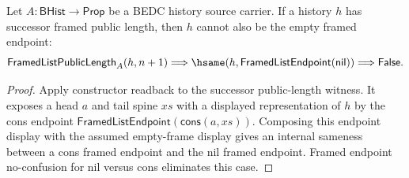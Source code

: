 
\begin{theorem}
\label{thm:framed-list-public-length-successor-empty-absurd}
Let $A:\mathsf{BHist}\to\mathsf{Prop}$ be a BEDC history source carrier. If a
history $h$ has successor framed public length, then $h$ cannot also be the
empty framed endpoint:
$$
\mathsf{FramedListPublicLength}_A(h,n+1)
\Longrightarrow
\hsame(h,\mathsf{FramedListEndpoint}(\mathsf{nil}))
\Longrightarrow
\mathsf{False}.
$$
\end{theorem}
\begin{proof}
Apply constructor readback to the successor public-length witness. It exposes
a head $a$ and tail spine $xs$ with a displayed representation of $h$ by the
cons endpoint $\mathsf{FramedListEndpoint}(\mathsf{cons}(a,xs))$. Composing
this endpoint display with the assumed empty-frame display gives an internal
sameness between a cons framed endpoint and the nil framed endpoint. Framed
endpoint no-confusion for nil versus cons eliminates this case.
\end{proof}

